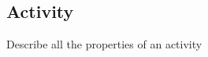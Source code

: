 \subsection{Activity}
\label{sec:formal activity}

\color{red}

Describe all the properties of an activity

\color{black}
